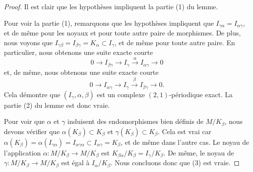 \begin{proof}
Il est clair que les hypothèses impliquent la partie (1) du lemme.

\medskip\noindent
Pour voir la partie (1), remarquons que les hypothèses impliquent que
$I_{\gamma\alpha} = I_{\alpha\gamma}$, et de même pour les noyaux
et pour toute autre paire de morphismes.
De plus, nous voyons que
$I_{\gamma\beta} =I_{\beta\gamma} = K_\alpha \subset I_\gamma$, et
de même pour toute autre paire. En particulier, nous obtenons une suite exacte courte
$$
0 \to I_{\beta\gamma} \to I_\gamma \xrightarrow{\alpha} I_{\alpha\gamma} \to 0
$$
et, de même, nous obtenons une suite exacte courte
$$
0 \to I_{\alpha\gamma} \to I_\gamma \xrightarrow{\beta} I_{\beta\gamma} \to 0.
$$
Cela démontre que $(I_\gamma, \alpha, \beta)$ est un complexe $(2, 1)$-périodique
exact. La partie (2) du lemme est donc vraie.

\medskip\noindent
Pour voir que $\alpha$ et $\gamma$ induisent des endomorphismes bien définis
de $M/K_\beta$, nous devons vérifier que $\alpha(K_\beta) \subset K_\beta$
et $\gamma(K_\beta) \subset K_\beta$. Cela est vrai car
$\alpha(K_\beta) = \alpha(I_{\gamma\alpha}) = I_{\alpha\gamma\alpha}
\subset I_{\alpha\gamma} = K_\beta$, et de même dans l'autre cas.
Le noyau de l'application $\alpha : M/K_\beta \to M/K_\beta$ est
$K_{\beta\alpha}/K_\beta = I_\gamma/K_\beta$. De même,
le noyau de $\gamma : M/K_\beta \to M/K_\beta$ est égal à
$I_\alpha/K_\beta$. Nous concluons donc que (3) est vraie.


\end{proof}
